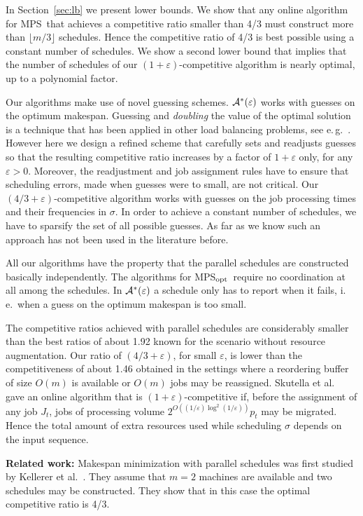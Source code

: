 \documentclass{llncs}
\newcommand{\MPS}{{\rm MPS}}
\newcommand{\MPSO}{{\rm MPS$_{\rm opt}$}}
\newcommand{\eps}{\varepsilon}
\begin{document}
In Section~\ref{sec:lb} we present lower bounds. We show that any online algorithm
for \MPS\ that achieves a competitive ratio smaller than 4/3 must construct more than $\lfloor m/3 \rfloor$
schedules. Hence the competitive ratio of 4/3 is best possible using a constant number of
schedules. We show a second lower bound that implies that the number of schedules of our 
$(1+\eps)$-competitive algorithm is nearly optimal, up to a polynomial factor.

Our algorithms make use of novel guessing schemes. ${\cal A}^*(\eps)$ works with guesses on the 
optimum makespan. Guessing and {\em doubling\/} the value of the optimal solution is a technique that
has been applied in other load balancing problems, see e.\,g.~\cite{Azar}. However here we 
design a refined scheme that carefully sets and readjusts guesses so that the resulting competitive
ratio increases by a factor of $1+\eps$ only, for any $\eps >0$. Moreover, the readjustment
and job assignment rules have to ensure that scheduling errors, made when guesses were to
small, are not critical. Our $(4/3+\eps)$-competitive algorithm works with guesses on the job processing
times and their frequencies in $\sigma$. In order to achieve a constant number of schedules, we have
to sparsify the set of all possible guesses. As far as we know such an approach has not been used 
in the literature before.

All our algorithms have the property that the parallel schedules are constructed basically independently.
The algorithms for \MPSO\ require no coordination at all among the schedules. In ${\cal A}^*(\eps)$ 
a schedule only has to report when it fails, i.\,e.\ when a guess on the optimum makespan is
too small.

The competitive ratios achieved with parallel schedules are considerably smaller than
the best ratios of about 1.92 known for the scenario without resource augmentation. Our ratio of $(4/3+\eps)$, 
for small $\eps$, is lower than the competitiveness of about 1.46 obtained in the settings where a 
reordering buffer of size $O(m)$ is available or $O(m)$ jobs may be reassigned. 
Skutella et al.~\cite{SSS} gave an online algorithm that is $(1+\eps)$-competitive if,
before the assignment of any job $J_t$, jobs of processing volume $2^{O((1/\eps)\log^2(1/\eps))}p_t$
may be migrated. Hence the total amount of extra resources used while scheduling $\sigma$
depends on the input sequence.



{\bf Related work:} Makespan minimization with parallel schedules was first studied by 
Kellerer et al.~\cite{KKST}. They assume that $m=2$ machines are available and two schedules may
be constructed. They show that in this case the optimal competitive ratio is 4/3.
\end{document}
